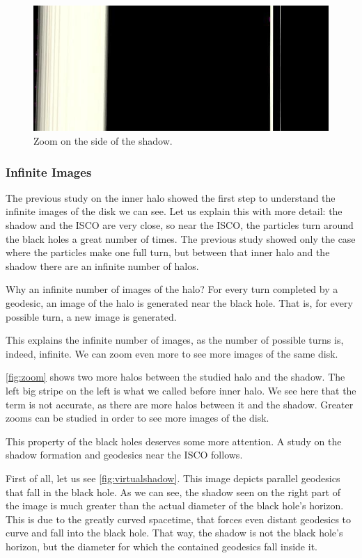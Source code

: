 \begin{figure}[bth]
	\myfloatalign
	\includegraphics[width=.6\linewidth]{gfx/zoom}
	\caption[Zoom on the side of the shadow]{Zoom on the side of the shadow.}
	\label{fig:zoom}
\end{figure}

\subsubsection*{Infinite Images}

The previous study on the inner halo showed the first step to understand the infinite images of the disk we can see. Let us explain this with more detail: the shadow and the \ac{ISCO} are very close, so near the \ac{ISCO}, the particles turn around the black holes a great number of times. The previous study showed only the case where the particles make one full turn, but between that inner halo and the shadow there are an infinite number of halos.

Why an infinite number of images of the halo? For every turn completed by a geodesic, an image of the halo is generated near the black hole. That is, for every possible turn, a new image is generated.

This explains the infinite number of images, as the number of possible turns is, indeed, infinite. We can zoom even more to see more images of the same disk. 

\autoref{fig:zoom} shows two more halos between the studied halo and the shadow. The left big stripe on the left is what we called before inner halo. We see here that the term is not accurate, as there are more halos between it and the shadow. Greater zooms can be studied in order to see more images of the disk.

This property of the black holes deserves some more attention. A study on the shadow formation and geodesics near the \ac{ISCO} follows.

First of all, let us see \autoref{fig:virtualshadow}. This image depicts parallel geodesics that fall in the black hole. As we can see, the shadow seen on the right part of the image is much greater than the actual diameter of the black hole's horizon. This is due to the greatly curved spacetime, that forces even distant geodesics to curve and fall into the black hole. That way, the shadow is not the black hole's horizon, but the diameter for which the contained geodesics fall inside it.

